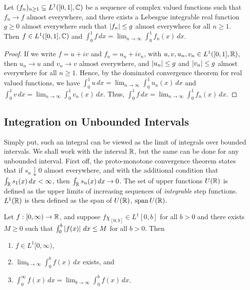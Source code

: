 \begin{proposition}
    Let $(f_{n})_{n\geq 1} \subseteq L^{1}([0,1],\mathbb{C})$ be a sequence of complex valued functions such that $f_{n} \to f$ almost everywhere, and there exists a Lebesgue integrable real function $g \geq 0$ almost everywhere such that $\left| f_{n} \right| \leq g$ almost everywhere for all $n \geq 1$. Then $f \in L^{1}([0,1],\mathbb{C})$ and $\int_{0}^{1} f \, dx = \lim_{n \to \infty} \int_{0}^{1} f_{n}(x) \, dx$.
\end{proposition}

\begin{proof}
    If we write $f = u+iv$ and $f_{n} = u_{n}+iv_{n}$, with $u,v,u_{n},v_{n} \in L^{1}([0,1],\mathbb{R})$, then $u_{n} \to u$ and $v_{n} \to v$ almost everywhere, and $\left| u_{n} \right| \leq g$ and $\left| v_{n} \right| \leq g$ almost everywhere for all $n \geq 1$. Hence, by the dominated convergence theorem for real valued functions, we have $\int_{0}^{1} u \, dx = \lim_{n \to \infty} \int_{0}^{1} u_{n}(x) \, dx$ and $\int_{0}^{1} v \, dx = \lim_{n \to \infty} \int_{0}^{1} v_{n}(x) \, dx$. Thus, $\int_{0}^{1} f \, dx = \lim_{n \to \infty} \int_{0}^{1} f_{n}(x) \, dx$.    
\end{proof}

\subsection{Integration on Unbounded Intervals}
Simply put, such an integral can be viewed as the limit of integrals over bounded intervals. We shall work with the interval $\mathbb{R}$, but the same can be done for any unbounded interval. First off, the proto-monotone convergence theorem states that if $s_{n} \downarrow 0$ almost everywhere, and with the additional condition that $\int_{\mathbb{R}} s_{1}(x) \, dx < \infty$, then $\int_{\mathbb{R}} s_{n}(x) \, dx \to 0$. The set of upper functions $U(\mathbb{R})$ is defined as the upper limits of increasing sequences of \textit{integrable} step functions. $L^{1}(\mathbb{R})$ is then defined as the span of $U(\mathbb{R})$, $\operatorname{span} U(\mathbb{R})$.

\begin{theorem}
    Let $f:[0,\infty) \to \mathbb{R}$, and suppose $f \chi_{[0,b]} \in L^{1}[0,b]$ for all $b > 0$ and there exists $M \geq 0$ such that $\int_{0}^{b} \left| f(x) \right| \, dx \leq M$ for all $b > 0$. Then 
    \begin{enumerate}
        \item $f \in L^{1}[0,\infty)$,
        \item $\lim_{b \to \infty} \int_{0}^{b} f(x) \, dx$ exists, and
        \item $\int_{0}^{\infty} f(x) \, dx = \lim_{b \to \infty} \int_{0}^{b} f(x) \, dx$.
    \end{enumerate}
\end{theorem}

